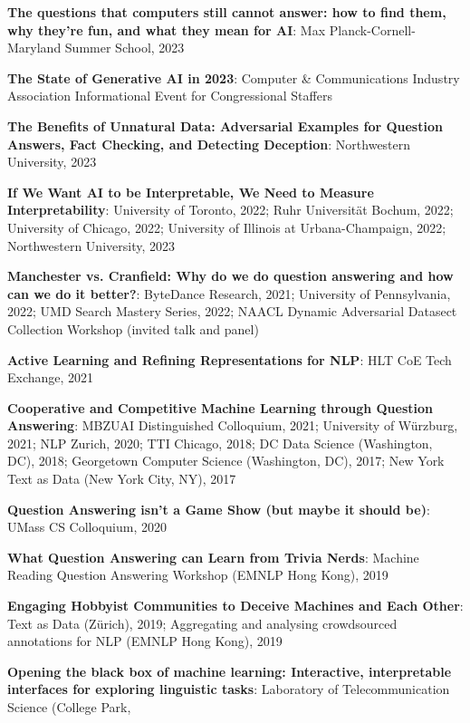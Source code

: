 {{  \begin{enumerate*}
    \item {\bf The questions that computers still cannot answer: how to find
    them, why they’re fun, and what they mean for AI}: Max
    Planck-Cornell-Maryland Summer School, 2023
    \item {\bf The State of Generative AI in 2023}: Computer \& Communications
    Industry Association  Informational Event for Congressional Staffers
    \item {\bf The Benefits of Unnatural Data: Adversarial Examples for
Question Answers, Fact Checking, and Detecting Deception}: Northwestern
University, 2023
    \item {\bf If We Want AI to be Interpretable, We Need to Measure
        Interpretability}: University of Toronto, 2022; Ruhr
      Universit\"at Bochum, 2022; University of Chicago, 2022;
      University of Illinois at Urbana-Champaign, 2022; Northwestern
        University, 2023
    \item {\bf Manchester vs. Cranfield: Why do we do question answering and
how can we do it better?}: ByteDance Research, 2021; University of
Pennsylvania, 2022; UMD Search Mastery Series, 2022; NAACL Dynamic
Adversarial Datasect Collection Workshop (invited talk and panel)
    \item {\bf Active Learning and Refining Representations for NLP}:
      HLT CoE Tech Exchange, 2021
\item {\bf Cooperative and Competitive Machine Learning through
    Question Answering}: MBZUAI Distinguished Colloquium, 2021;
  University of W\"urzburg, 2021; NLP Zurich, 2020; TTI Chicago, 2018; DC Data Science (Washington, DC), 2018; Georgetown Computer Science (Washington, DC),
  2017; New York Text as Data (New York City, NY), 2017
  \item {\bf Question
      Answering isn't a Game Show (but maybe it should be)}: UMass CS
    Colloquium, 2020
\item {\bf What Question Answering can Learn from Trivia Nerds}:
  Machine Reading Question Answering Workshop (EMNLP Hong Kong), 2019
\item {\bf  Engaging Hobbyist
Communities to Deceive Machines and
Each Other}: Text as Data (Z\"urich), 2019; Aggregating and analysing
crowdsourced annotations for NLP (EMNLP Hong Kong), 2019
\item {\bf Opening the black box of machine learning: Interactive, interpretable interfaces for exploring linguistic tasks}: Laboratory of Telecommunication Science (College Park,

\end{enumerate*}}}
